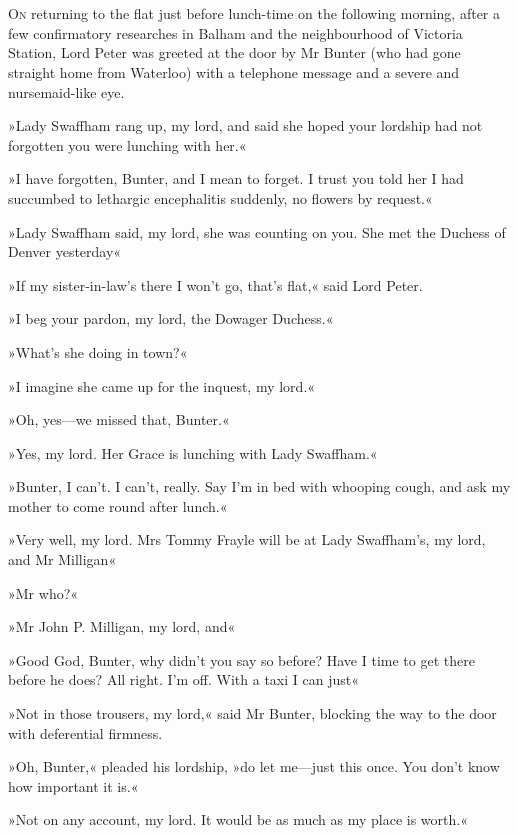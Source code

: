 \chapter[Chapter \thechapter]{}
\lettrine[lines=4]{O}{n} returning to the flat just before lunch-time on the following morning, after a few confirmatory researches in Balham and the neighbourhood of Victoria Station, Lord Peter was greeted at the door by Mr Bunter (who had gone straight home from Waterloo) with a telephone message and a severe and nursemaid-like eye.

»Lady Swaffham rang up, my lord, and said she hoped your lordship had not forgotten you were lunching with her.«

»I have forgotten, Bunter, and I mean to forget. I trust you told her I had succumbed to lethargic encephalitis suddenly, no flowers by request.«

»Lady Swaffham said, my lord, she was counting on you. She met the Duchess of Denver yesterday\longdash«

»If my sister-in-law's there I won't go, that's flat,« said Lord Peter.

»I beg your pardon, my lord, the Dowager Duchess.«

»What's she doing in town?«

»I imagine she came up for the inquest, my lord.«

»Oh, yes—we missed that, Bunter.«

»Yes, my lord. Her Grace is lunching with Lady Swaffham.«

»Bunter, I can't. I can't, really. Say I'm in bed with whooping cough, and ask my mother to come round after lunch.«

»Very well, my lord. Mrs Tommy Frayle will be at Lady Swaffham's, my lord, and Mr Milligan\longdash«

»Mr who?«

»Mr John P. Milligan, my lord, and\longdash«

»Good God, Bunter, why didn't you say so before? Have I time to get there before he does? All right. I'm off. With a taxi I can just\longdash«

»Not in those trousers, my lord,« said Mr Bunter, blocking the way to the door with deferential firmness.

»Oh, Bunter,« pleaded his lordship, »do let me—just this once. You don't know how important it is.«

»Not on any account, my lord. It would be as much as my place is worth.«

